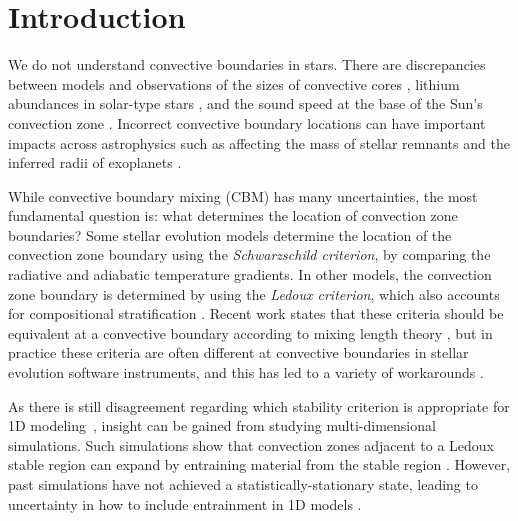 
\section{Introduction}
\label{sec:introduction}
We do not understand convective boundaries in stars.
There are discrepancies between models and observations of the sizes of convective cores \citep{claret_torres_2018, viani_basu_2020, pedersen_etal_2021, johnston_2021}, lithium abundances in solar-type stars \citep{pinsonneault_1997, sestito_randich_2005, carlos_etal_2019, dumont_etal_2021}, and the sound speed at the base of the Sun's convection zone \citep[see][Sec.~7.2.1]{basu_2016}.
Incorrect convective boundary locations can have important impacts across astrophysics such as affecting the mass of stellar remnants \citep{farmer_etal_2019, mehta_etal_2022} and the inferred radii of exoplanets \citep{basu_etal_2012, morrell_2020}.

While convective boundary mixing (CBM) has many uncertainties, the most fundamental question is: what determines the location of convection zone boundaries? 
Some stellar evolution models determine the location of the convection zone boundary using the \emph{Schwarzschild criterion}, by comparing the radiative and adiabatic temperature gradients.
In other models, the convection zone boundary is determined by using the \emph{Ledoux criterion}, which also accounts for compositional stratification \citep[][chapter 3, reviews these criteria]{salaris_cassisi_2017}.
Recent work states that these criteria should be equivalent at a convective boundary according to mixing length theory \citep{gabriel_etal_2014, mesa4, mesa5}, but in practice these criteria are often different at convective boundaries in stellar evolution software instruments, and this has led to a variety of workarounds \citep{mesa4,mesa5}.

As there is still disagreement regarding which stability criterion is appropriate for 1D modeling~\citep[see][chapter 2]{kaiser_etal_2020}, insight can be gained from studying multi-dimensional simulations.
Such simulations show that convection zones adjacent to a Ledoux stable region can expand by entraining material from the stable region \citep{meakin_arnett_2007, woodward_etal_2015, jones_etal_2017, cristini_etal_2019, fuentes_cumming_2020, andrassy_etal_2020, andrassy_etal_2021}.
However, past simulations have not achieved a statistically-stationary state, leading to uncertainty in how to include entrainment in 1D models \citep{staritsin_2013, scott_etal_2021}.

